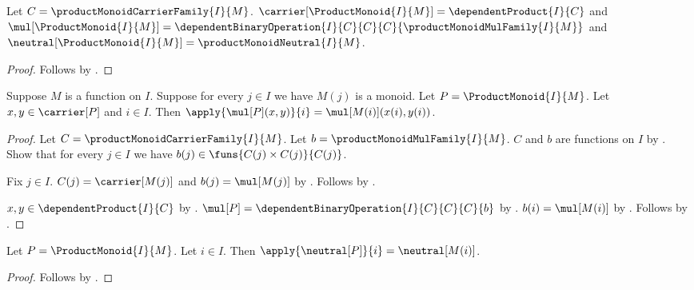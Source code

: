 \begin{proposition}\label{product_monoid_fields}
    Let $C=\productMonoidCarrierFamily{I}{M}$.
    $\carrier[\ProductMonoid{I}{M}]=\dependentProduct{I}{C}$ and
    $\mul[\ProductMonoid{I}{M}]
        =\dependentBinaryOperation{I}{C}{C}{C}{
            \productMonoidMulFamily{I}{M}}$ and
    $\neutral[\ProductMonoid{I}{M}]
        =\productMonoidNeutral{I}{M}$.
\end{proposition}
\begin{proof}
    Follows by
        .
\end{proof}

\begin{proposition}\label{product_monoid_mul_coordinate}
    Suppose $M$ is a function on $I$.
    Suppose for every $j\in I$ we have $M(j)$ is a monoid.
    Let $P=\ProductMonoid{I}{M}$.
    Let $x,y\in\carrier[P]$ and $i\in I$.
    Then
        $\apply{\mul[P](x,y)}{i}=\mul[M(i)](x(i),y(i))$.
\end{proposition}
\begin{proof}
    Let $C=\productMonoidCarrierFamily{I}{M}$.
    Let $b=\productMonoidMulFamily{I}{M}$.
    $C$ and $b$ are functions on $I$ by
        .
    Show that for every $j\in I$ we have
        $b(j)\in\funs{C(j)\times C(j)}{C(j)}$.
    \begin{subproof}
        Fix $j\in I$.
        $C(j)=\carrier[M(j)]$ and $b(j)=\mul[M(j)]$ by
            .
        Follows by
            .
    \end{subproof}
    $x,y\in\dependentProduct{I}{C}$ by
        .
    $\mul[P]=\dependentBinaryOperation{I}{C}{C}{C}{b}$ by
        .
    $b(i)=\mul[M(i)]$ by
        .
    Follows by .
\end{proof}

\begin{proposition}\label{product_monoid_neutral_coordinate_exact}
    Let $P=\ProductMonoid{I}{M}$.
    Let $i\in I$.
    Then $\apply{\neutral[P]}{i}=\neutral[M(i)]$.
\end{proposition}
\begin{proof}
    Follows by
        .
\end{proof}

